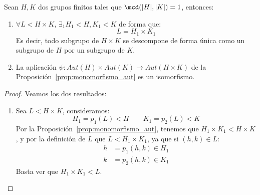 \begin{teo}\label{teo:grupos_finitos_producto}
    Sean $H,K$ dos grupos finitos tales que $\mcd(|H|,|K|) = 1$, entonces: 
    \begin{enumerate}
        \item $\forall L<H\times K$, $\exists_1 H_1<H, K_1<K$ de forma que:
            \begin{equation*}
                L = H_1\times K_1
            \end{equation*}
            Es decir, todo subgrupo de $H\times K$ se descompone de forma única como un subgrupo de $H$ por un subgrupo de $K$.
        \item La aplicación $\psi:Aut(H)\times Aut(K)\to Aut(H\times K)$ de la Proposición~\ref{prop:monomorfismo_aut} es un isomorfismo.
    \end{enumerate}
    \begin{proof}
        Veamos los dos resultados:
        \begin{enumerate}
            \item Sea $L<H\times K$, consideramos:
                \begin{equation*}
                    H_1 = p_1(L) < H \qquad K_1 = p_2(L) < K
                \end{equation*}
                Por la Proposición~\ref{prop:monomorfismo_aut}, tenemos que $H_1\times K_1 < H\times K$, y por la definición de $L$ que $L < H_1\times K_1$, ya que si $(h,k)\in L$:
                \begin{align*}
                    h &= p_1(h,k) \in  H_1 \\
                    k &= p_2(h,k) \in K_1
                \end{align*}
                Basta ver que $H_1\times K_1 < L$.


\end{enumerate}
\end{proof}
\end{teo}
